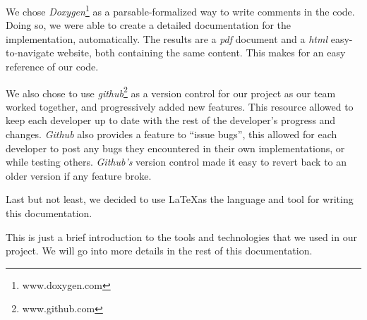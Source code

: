 We chose \emph{Doxygen}\footnote{www.doxygen.com} as a parsable-formalized way to write comments in the code. Doing so, we were able to create a detailed documentation for the implementation, automatically. The results are a \emph{pdf} document and a \emph{html} easy-to-navigate website, both containing the same content. This makes for an easy reference of our code.

We also chose to use \emph{github}\footnote{www.github.com} as a version control for our project as our team worked together, and progressively added new features. This resource allowed to keep each developer up to date with the rest of the developer's progress and changes. \emph{Github} also provides a feature to ``issue bugs'', this allowed for each developer to post any bugs they encountered in their own implementations, or while testing others. \emph{Github's} version control made it easy to revert back to an older version if any feature broke. 

Last but not least, we decided to use \LaTeX as the language and tool for writing this documentation.

This is just a brief introduction to the tools and technologies that we used in our project. We will go into more details in the rest of this documentation.